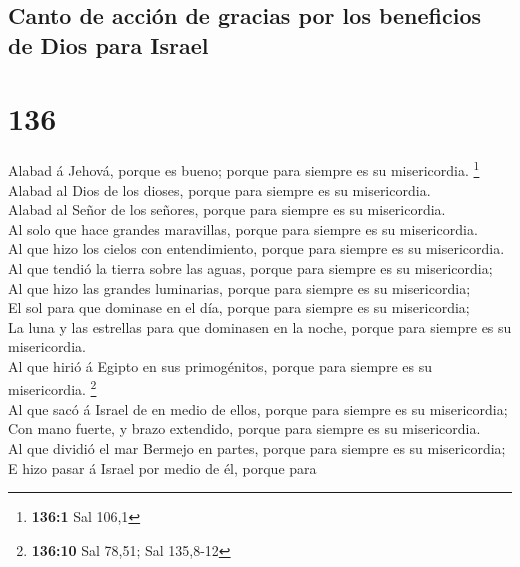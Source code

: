 \hypertarget{canto-de-acciuxf3n-de-gracias-por-los-beneficios-de-dios-para-israel}{%
\subsection{Canto de acción de gracias por los beneficios de Dios para
Israel}\label{canto-de-acciuxf3n-de-gracias-por-los-beneficios-de-dios-para-israel}}

\hypertarget{section-135}{%
\section{136}\label{section-135}}

 Alabad á Jehová, porque es bueno; porque para siempre es
su misericordia. \footnote{\textbf{136:1} Sal 106,1}\\
 Alabad al Dios de los dioses, porque para siempre es su
misericordia.\\
 Alabad al Señor de los señores, porque para siempre es su
misericordia.\\
 Al solo que hace grandes maravillas, porque para siempre
es su misericordia.\\
 Al que hizo los cielos con entendimiento, porque para
siempre es su misericordia.\\
 Al que tendió la tierra sobre las aguas, porque para
siempre es su misericordia;\\
 Al que hizo las grandes luminarias, porque para siempre
es su misericordia;\\
 El sol para que dominase en el día, porque para siempre
es su misericordia;\\
 La luna y las estrellas para que dominasen en la noche,
porque para siempre es su misericordia.\\
 Al que hirió á Egipto en sus primogénitos, porque para
siempre es su misericordia. \footnote{\textbf{136:10} Sal 78,51; Sal
  135,8-12}\\
 Al que sacó á Israel de en medio de ellos, porque para
siempre es su misericordia;\\
 Con mano fuerte, y brazo extendido, porque para siempre
es su misericordia.\\
 Al que dividió el mar Bermejo en partes, porque para
siempre es su misericordia;\\
 E hizo pasar á Israel por medio de él, porque para
